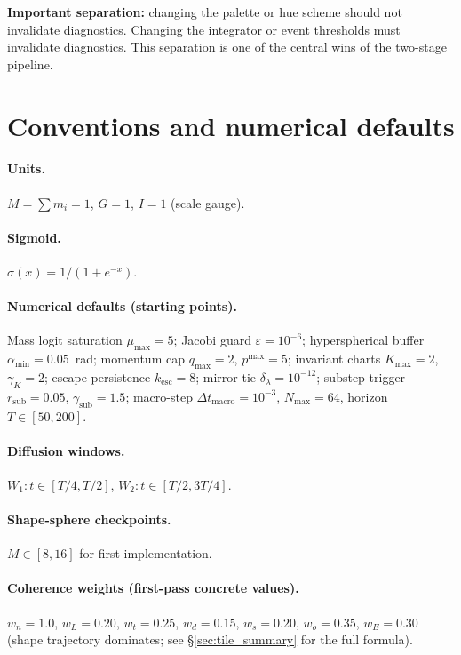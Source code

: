 \documentclass[11pt]{report}
\begin{document}
\textbf{Important separation:} changing the palette or hue scheme should not invalidate diagnostics. Changing the integrator or event thresholds must invalidate diagnostics. This separation is one of the central wins of the two-stage pipeline.

\newpage
\appendix

\section{Conventions and numerical defaults}
\label{app:defaults}

\paragraph{Units.} $M=\sum m_i=1$, $G=1$, $I=1$ (scale gauge).

\paragraph{Sigmoid.} $\sigma(x)=1/(1+e^{-x})$.

\paragraph{Numerical defaults (starting points).}
Mass logit saturation $\mu_{\max}=5$; Jacobi guard $\varepsilon=10^{-6}$; hyperspherical buffer $\alpha_{\min}=0.05$~rad; momentum cap $q_{\max}=2$, $p^{\max}=5$; invariant charts $K_{\max}=2$, $\gamma_K=2$; escape persistence $k_{\mathrm{esc}}=8$; mirror tie $\delta_\lambda=10^{-12}$; substep trigger $r_{\text{sub}}=0.05$, $\gamma_{\text{sub}}=1.5$; macro-step $\Delta t_{\text{macro}}=10^{-3}$, $N_{\max}=64$, horizon $T\in[50,200]$.

\paragraph{Diffusion windows.} $W_1: t\in[T/4,T/2]$, $W_2: t\in[T/2,3T/4]$.

\paragraph{Shape-sphere checkpoints.} $M\in[8,16]$ for first implementation.

\paragraph{Coherence weights (first-pass concrete values).} $w_n=1.0$, $w_L=0.20$, $w_t=0.25$, $w_d=0.15$, $w_s=0.20$, $w_o=0.35$, $w_E=0.30$ (shape trajectory dominates; see \S\ref{sec:tile_summary} for the full formula).
\end{document}
